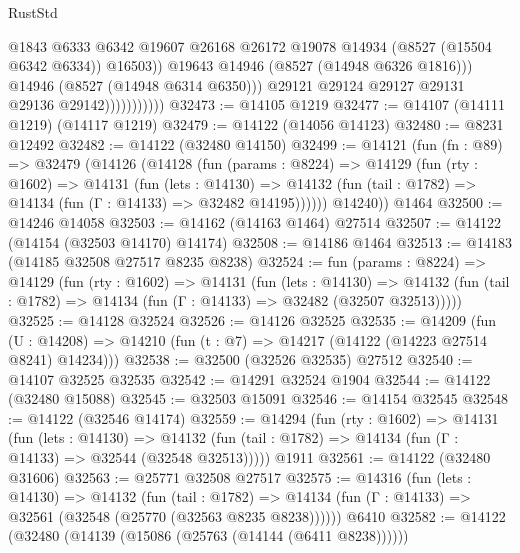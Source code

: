 \begin{lexlean}{RustStd}
\begin{coremodule}
                                  @1843
                                  @6333
                                  @6342
                                  @19607
                                  @26168
                                  @26172
                                  @19078
                                  @14934
                                  (@8527 (@15504 @6342 @6334))
                                  @16503))
                              @19643
                              @14946
                              (@8527 (@14948 @6326 @1816)))
                            @14946
                            (@8527 (@14948 @6314 @6350)))
                          @29121
                          @29124
                          @29127
                          @29131
                          @29136
                          @29142)))))))))))
@32473 := @14105 @1219
@32477 := @14107 (@14111 @1219) (@14117 @1219)
@32479 := @14122 (@14056 @14123)
@32480 := @8231 @12492
@32482 := @14122 (@32480 @14150)
@32499 := @14121
    (fun (fn : @89) =>
    @32479
      (@14126
        (@14128
          (fun (params : @8224) =>
          @14129
            (fun (rty : @1602) =>
            @14131
              (fun (lets : @14130) =>
              @14132 (fun (tail : @1782) => @14134 (fun (Γ : @14133) => @32482 @14195))))))
        @14240))
    @1464
@32500 := @14246 @14058
@32503 := @14162 (@14163 @1464) @27514
@32507 := @14122 (@14154 (@32503 @14170) @14174)
@32508 := @14186 @1464
@32513 := @14183 (@14185 @32508 @27517 @8235 @8238)
@32524 := fun (params : @8224) =>
  @14129
    (fun (rty : @1602) =>
    @14131
      (fun (lets : @14130) =>
      @14132 (fun (tail : @1782) => @14134 (fun (Γ : @14133) => @32482 (@32507 @32513)))))
@32525 := @14128 @32524
@32526 := @14126 @32525
@32535 := @14209
    (fun (U : @14208) => @14210 (fun (t : @7) => @14217 (@14122 (@14223 @27514 @8241) @14234)))
@32538 := @32500 (@32526 @32535) @27512
@32540 := @14107 @32525 @32535
@32542 := @14291 @32524 @1904
@32544 := @14122 (@32480 @15088)
@32545 := @32503 @15091
@32546 := @14154 @32545
@32548 := @14122 (@32546 @14174)
@32559 := @14294
    (fun (rty : @1602) =>
    @14131
      (fun (lets : @14130) =>
      @14132 (fun (tail : @1782) => @14134 (fun (Γ : @14133) => @32544 (@32548 @32513)))))
    @1911
@32561 := @14122 (@32480 @31606)
@32563 := @25771 @32508 @27517
@32575 := @14316
    (fun (lets : @14130) =>
    @14132
      (fun (tail : @1782) =>
      @14134 (fun (Γ : @14133) => @32561 (@32548 (@25770 (@32563 @8235 @8238))))))
    @6410
@32582 := @14122 (@32480 (@14139 (@15086 (@25763 (@14144 (@6411 @8238))))))

\end{coremodule}
\end{lexlean}
